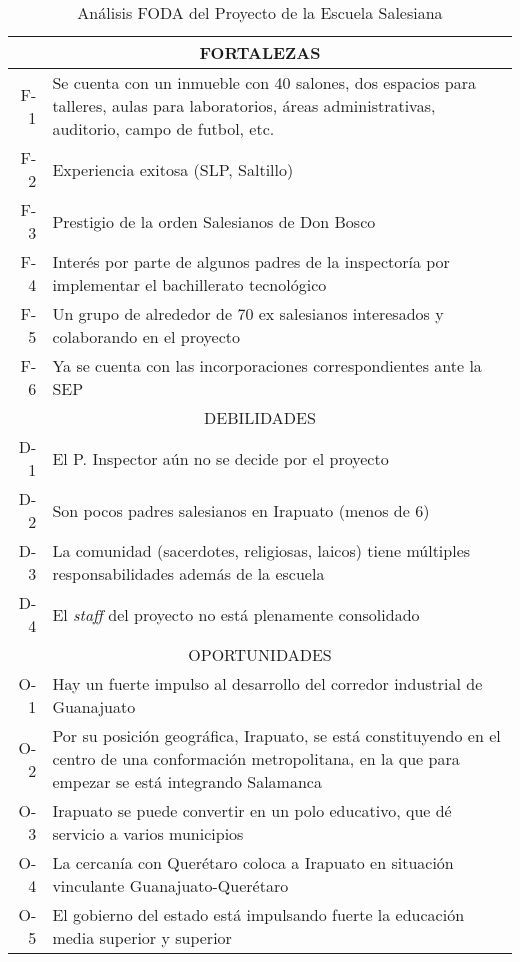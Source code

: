 \begin{table}[h!]
    \centering
    \caption{Análisis FODA del Proyecto de la Escuela Salesiana}
    \label{tbl:Foda}
    \footnotesize
    \begin{tabular}{r|p{5in}}
    	\multicolumn{2}{c}{FORTALEZAS} \\
    	\hline
    	\hline
    	F-1 & Se cuenta con un inmueble con 40 salones, dos espacios para talleres, aulas para laboratorios, áreas administrativas, auditorio, campo de futbol, etc. \\
    	F-2 & Experiencia exitosa (SLP, Saltillo) \\
    	F-3 & Prestigio de la orden Salesianos de Don Bosco \\
    	F-4 & Interés por parte de algunos padres de la inspectoría por implementar el bachillerato tecnológico \\
    	F-5 & Un grupo de alrededor de 70 ex salesianos interesados y colaborando en el proyecto \\
    	F-6 & Ya se cuenta con las incorporaciones correspondientes ante la SEP \\
    	\hline
    	\multicolumn{2}{c}{DEBILIDADES} \\
    	\hline
    	\hline
    	D-1 & El P. Inspector aún no se decide por el proyecto \\
    	D-2 & Son pocos padres salesianos en Irapuato (menos de 6) \\
    	D-3 & La comunidad (sacerdotes, religiosas, laicos) tiene múltiples responsabilidades además de la escuela \\
    	D-4 & El \emph{staff} del proyecto no est\'a plenamente consolidado \\
    	\hline
    	\multicolumn{2}{c}{OPORTUNIDADES} \\
    	\hline
    	\hline
    	O-1 & Hay un fuerte impulso al desarrollo del corredor industrial de Guanajuato \\
    	O-2 & Por su posición geográfica, Irapuato, se está constituyendo en el centro de una conformación metropolitana, en la que para empezar se está integrando Salamanca \\
    	O-3 & Irapuato se puede convertir en un polo educativo, que dé servicio a varios municipios \\
    	O-4 & La cercanía con Querétaro coloca a Irapuato en situación vinculante Guanajuato-Querétaro \\
    	O-5 & El gobierno del estado está impulsando fuerte la educación media superior y superior \\

\end{tabular}
\end{table}

